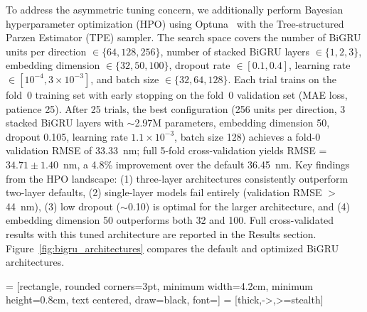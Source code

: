 \documentclass[journal=jcisd8,manuscript=article]{achemso}
\begin{document}
To address the asymmetric tuning concern, we additionally perform Bayesian hyperparameter optimization (HPO) using Optuna~\cite{akiba2019optuna} with the Tree-structured Parzen Estimator (TPE) sampler.
The search space covers the number of BiGRU units per direction $\in \{64, 128, 256\}$, number of stacked BiGRU layers $\in \{1, 2, 3\}$, embedding dimension $\in \{32, 50, 100\}$, dropout rate $\in [0.1, 0.4]$, learning rate $\in [10^{-4}, 3 \times 10^{-3}]$, and batch size $\in \{32, 64, 128\}$.
Each trial trains on the fold~0 training set with early stopping on the fold~0 validation set (MAE loss, patience 25).
After 25 trials, the best configuration (256 units per direction, 3 stacked BiGRU layers with $\sim$2.97M parameters, embedding dimension 50, dropout 0.105, learning rate $1.1 \times 10^{-3}$, batch size 128) achieves a fold-0 validation RMSE of 33.33~nm; full 5-fold cross-validation yields RMSE = $34.71 \pm 1.40$~nm, a 4.8\% improvement over the default 36.45~nm.
Key findings from the HPO landscape: (1) three-layer architectures consistently outperform two-layer defaults, (2) single-layer models fail entirely (validation RMSE $>$44~nm), (3) low dropout ($\sim$0.10) is optimal for the larger architecture, and (4) embedding dimension 50 outperforms both 32 and 100.
Full cross-validated results with this tuned architecture are reported in the Results section.
Figure~\ref{fig:bigru_architectures} compares the default and optimized BiGRU architectures.

 = [rectangle, rounded corners=3pt, minimum width=4.2cm, minimum height=0.8cm, text centered, draw=black, font=\small]
 = [thick,->,>=stealth]
\end{document}
